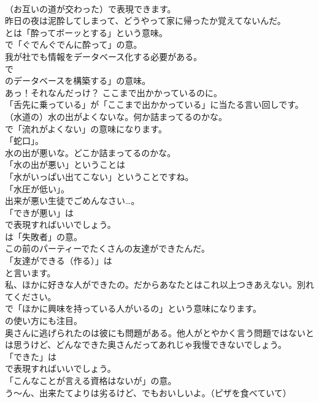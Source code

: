 \documentclass[8pt]{extreport}
\begin{document}
\begin{CJK}{UTF8}{min}
\\	（お互いの道が交わった）で表現できます。	
\\	昨日の夜は泥酔してしまって、どうやって家に帰ったか覚えてないんだ。 
\\	とは「酔ってボーッとする」という意味。
\\	で「ぐでんぐでんに酔って」の意。	
\\	我が社でも情報をデータベース化する必要がある。 
\\	で
\\	のデータベースを構築する」の意味。	
\\	あっ！それなんだっけ？ ここまで出かかっているのに。 
\\	「舌先に乗っている」が「ここまで出かかっている」に当たる言い回しです。	
\\	（水道の）水の出がよくないな。何か詰まってるのかな。 
\\	で「流れがよくない」の意味になります。
\\	「蛇口」。	
\\	水の出が悪いな。どこか詰まってるのかな。 
\\	「水の出が悪い」ということは
\\	「水がいっぱい出てこない」ということですね。
\\	「水圧が低い」。	
\\	出来が悪い生徒でごめんなさい…。 
\\	「できが悪い」は 
\\	で表現すればいいでしょう。
\\	は「失敗者」の意。	
\\	この前のパーティーでたくさんの友達ができたんだ。 
\\	「友達ができる（作る）」は
\\	と言います。	
\\	私、ほかに好きな人ができたの。だからあなたとはこれ以上つきあえない。別れてください。 
\\	で「ほかに興味を持っている人がいるの」という意味になります。
\\	の使い方にも注目。	
\\	奥さんに逃げられたのは彼にも問題がある。他人がとやかく言う問題ではないとは思うけど、どんなできた奥さんだってあれじゃ我慢できないでしょう。 
\\	「できた」は
\\	で表現すればいいでしょう。
\\	「こんなことが言える資格はないが」の意。	
\\	う～ん、出来たてよりは劣るけど、でもおいしいよ。（ピザを食べていて） 

\end{CJK}
\end{document}
